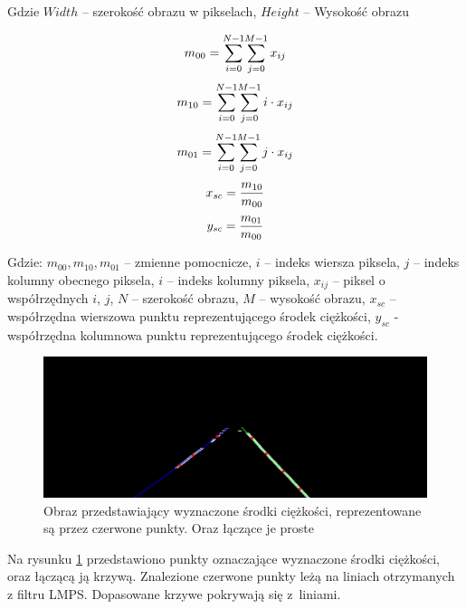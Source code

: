 \noindent Gdzie $Width$ -- szerokość obrazu w pikselach, $Height$ -- Wysokość obrazu


\begin{equation}
m_{00}={\sum _{i=0}^{N-1}}{\sum _{j=0}^{M-1}x_{ij}}\\[10pt]
\label{eq:sc_11}
\end{equation}
\begin{equation}
m_{10}={\sum _{i=0}^{N-1}}{\sum _{j=0}^{M-1}i \cdot x_{ij}}\\[10pt]
\label{eq:sc_12}
\end{equation}
\begin{equation}
m_{01}={\sum _{i=0}^{N-1}}{\sum _{j=0}^{M-1}j \cdot x_{ij}}\\[10pt]
\label{eq:sc_13}
\end{equation}
\begin{equation}
x_{sc}={\frac {m_{10}}{m_{00}}}\\[10pt]
\label{eq:sc_14}
\end{equation}
\begin{equation}
y_{sc}={\frac {m_{01}}{m_{00}}}\\[10pt]
\label{eq:sc_15}
\end{equation}

\noindent Gdzie: $m_{00}, m_{10}, m_{01}$ -- zmienne pomocnicze, $i$ -- indeks wiersza piksela, $j$ -- indeks kolumny obecnego piksela, $i$ -- indeks kolumny piksela, $x_{ij}$ -- piksel o współrzędnych $i$, $j$, $N$ -- szerokość obrazu, $M$ -- wysokość obrazu, $x_{sc}$ -- współrzędna wierszowa punktu reprezentującego środek ciężkości, $y_{sc}$ - współrzędna kolumnowa punktu reprezentującego środek ciężkości.

\begin{figure}[h]
	\centering
	\includegraphics[scale=0.3]{krzywe.png}
	\caption{Obraz przedstawiający wyznaczone środki ciężkości, reprezentowane są przez czerwone punkty. Oraz łączące je proste}
	\label{fig:mass_centers1}
\end{figure}

Na rysunku \ref{fig:mass_centers1} przedstawiono punkty oznaczające wyznaczone środki ciężkości, oraz łączącą ją krzywą.
Znalezione czerwone punkty leżą na liniach otrzymanych z filtru LMPS. 
Dopasowane krzywe pokrywają się z~liniami. 
